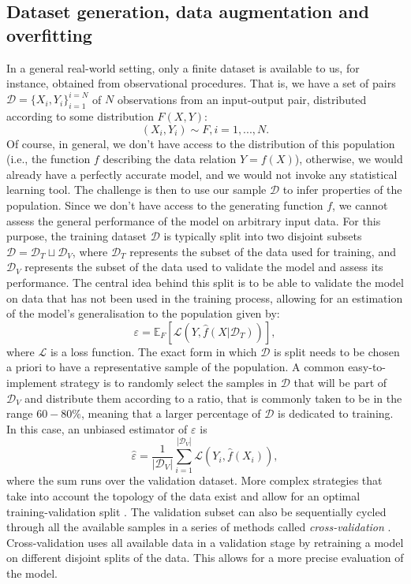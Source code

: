 \subsection{Dataset generation, data augmentation and overfitting}\label{sec: dataset}

In a general real-world setting, only a finite dataset is available to us, for instance, obtained from observational procedures.
That is, we have a set of pairs $\mathcal{D}=\{X_i, Y_i \}_{i=1}^{i=N}$ of $N$ observations from an input-output pair, distributed according to some distribution $F(X, Y)$:
\begin{equation}
    (X_i,Y_i) \sim F, i=1,...,N.
\end{equation}
Of course, in general, we don't have access to the distribution of this population (i.e., the function $f$ describing the data relation $Y=f(X)$), otherwise, we would already have a perfectly accurate model, and we would not invoke any statistical learning tool.
The challenge is then to use our sample $\mathcal{D}$ to infer properties of the population.
Since we don't have access to the generating function $f$, we cannot assess the general performance of the model on arbitrary input data.
For this purpose, the training dataset $\mathcal{D}$ is typically split into two disjoint subsets $\mathcal{D}=\mathcal{D}_T \sqcup \mathcal{D}_V$, where $\mathcal{D}_T$ represents the subset of the data used for training, and $\mathcal{D}_V$ represents the subset of the data used to validate the model and assess its performance.
The central idea behind this split is to be able to validate the model on data that has not been used in the training process, allowing for an estimation of the model's generalisation to the population given by:
\begin{equation}\label{eq_ch3:global_loss}
    \varepsilon =\mathbb{E}_F[\mathcal{L}(Y,\hat{f}(X|\mathcal{D}_T))],
\end{equation}
where $\mathcal{L}$ is a loss function.
The exact form in which $\mathcal{D}$ is split needs to be chosen a priori to have a representative sample of the population.
A common easy-to-implement strategy is to randomly select the samples in $\mathcal{D}$ that will be part of $\mathcal{D}_V$ and distribute them according to a ratio, that is commonly taken to be in the range $60-80\%$, meaning that a larger percentage of $\mathcal{D}$ is dedicated to training.
In this case, an unbiased estimator of $\varepsilon$ is
\begin{equation}
    \hat{\varepsilon}=\frac{1}{|\mathcal{D}_V|}\sum_{i=1}^{|\mathcal{D}_V|}\mathcal{L}(Y_i,\hat{f}(X_i)),
\end{equation}
where the sum runs over the validation dataset.
More complex strategies that take into account the topology of the data exist and allow for an optimal training-validation split \cite{data_split}. 
The validation subset can also be sequentially cycled through all the available samples in a series of methods called \emph{cross-validation} \cite{cross_validation}. Cross-validation uses all available data in a validation stage by retraining a model on different disjoint splits of the data. This allows for a more precise evaluation of the model.

